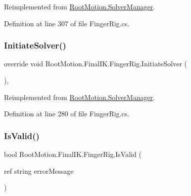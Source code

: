 Reimplemented from \mbox{\hyperlink{class_root_motion_1_1_solver_manager_addb54e92acd91364a9205c5807a42776}{Root\+Motion.\+Solver\+Manager}}.



Definition at line 307 of file Finger\+Rig.\+cs.

\mbox{\label{class_root_motion_1_1_final_i_k_1_1_finger_rig_aa32e72eb590a6e441ed8de3f1ce95655}} 
\subsubsection{\texorpdfstring{Initiate\+Solver()}{InitiateSolver()}}
{\footnotesize\ttfamily override void Root\+Motion.\+Final\+I\+K.\+Finger\+Rig.\+Initiate\+Solver (\begin{DoxyParamCaption}{ }\end{DoxyParamCaption})\hspace{0.3cm}{\ttfamily [protected]}, {\ttfamily [virtual]}}



Reimplemented from \mbox{\hyperlink{class_root_motion_1_1_solver_manager_abd2008369f3de95712d5748aa4ce6243}{Root\+Motion.\+Solver\+Manager}}.



Definition at line 280 of file Finger\+Rig.\+cs.

\mbox{\label{class_root_motion_1_1_final_i_k_1_1_finger_rig_ada25c469ee86aef1bfb916fca8b180ed}} 
\subsubsection{\texorpdfstring{Is\+Valid()}{IsValid()}}
{\footnotesize\ttfamily bool Root\+Motion.\+Final\+I\+K.\+Finger\+Rig.\+Is\+Valid (\begin{DoxyParamCaption}\item[{ref string}]{error\+Message }\end{DoxyParamCaption})}



